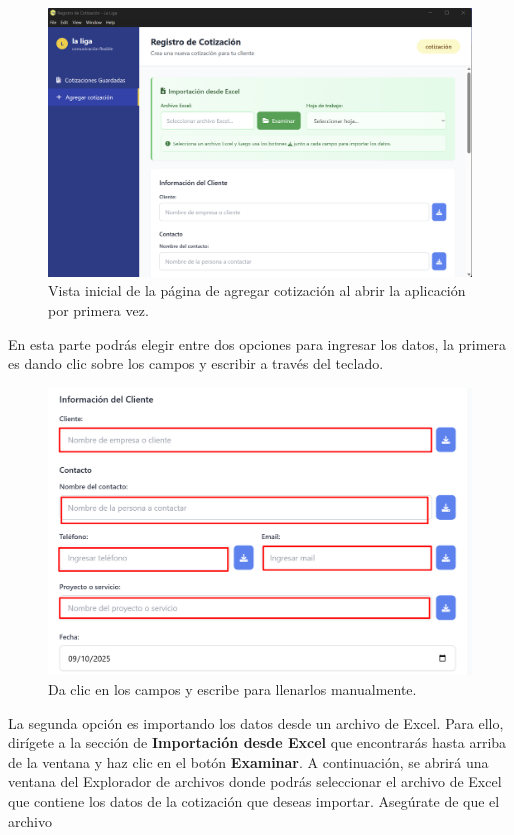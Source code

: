 \documentclass{Pretexto/bluereport}
\begin{document}
\begin{figure}[H] 
    \centering
        \includegraphics[width=0.85\linewidth]{img/add_cotizacion_inicial.png}
\caption{Vista inicial de la página de agregar cotización al abrir la aplicación por primera vez.}\label{fig:vista_inicial_add}
\end{figure}
En esta parte podrás elegir entre dos opciones para ingresar los datos, la primera es dando clic sobre los campos y escribir a través del teclado.
\begin{figure}[H] 
    \centering
        \includegraphics[width=0.85\linewidth]{img/llenar_campos.png}
    \caption{Da clic en los campos y escribe para llenarlos manualmente.}
    \label{fig:llenado_manual1}
\end{figure}
La segunda opción es importando los datos desde un archivo de Excel. Para ello, dirígete a la sección de 
\textbf{Importación desde Excel} que encontrarás hasta arriba de la ventana y haz clic en el botón \textbf{Examinar}. A continuación, se abrirá una ventana 
del Explorador de archivos donde podrás seleccionar el archivo de Excel que contiene los datos de la cotización que deseas importar. Asegúrate de que el archivo 
\end{document}
